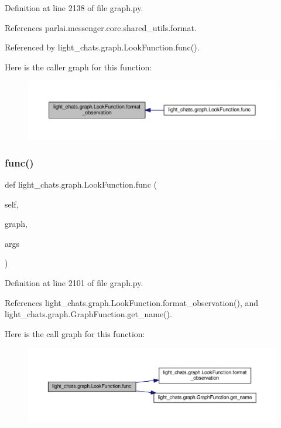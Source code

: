 Definition at line 2138 of file graph.\+py.



References parlai.\+messenger.\+core.\+shared\+\_\+utils.\+format.



Referenced by light\+\_\+chats.\+graph.\+Look\+Function.\+func().

Here is the caller graph for this function\+:
\nopagebreak
\begin{figure}[H]
\begin{center}
\leavevmode
\includegraphics[width=350pt]{classlight__chats_1_1graph_1_1LookFunction_a7723e1da8ce79443c49fd4a5f6dce978_icgraph}
\end{center}
\end{figure}
\mbox{\label{classlight__chats_1_1graph_1_1LookFunction_aeaedd1fa680a930dc86a1120d9daf63d}} 
\subsubsection{\texorpdfstring{func()}{func()}}
{\footnotesize\ttfamily def light\+\_\+chats.\+graph.\+Look\+Function.\+func (\begin{DoxyParamCaption}\item[{}]{self,  }\item[{}]{graph,  }\item[{}]{args }\end{DoxyParamCaption})}



Definition at line 2101 of file graph.\+py.



References light\+\_\+chats.\+graph.\+Look\+Function.\+format\+\_\+observation(), and light\+\_\+chats.\+graph.\+Graph\+Function.\+get\+\_\+name().

Here is the call graph for this function\+:
\nopagebreak
\begin{figure}[H]
\begin{center}
\leavevmode
\includegraphics[width=350pt]{classlight__chats_1_1graph_1_1LookFunction_aeaedd1fa680a930dc86a1120d9daf63d_cgraph}
\end{center}
\end{figure}


